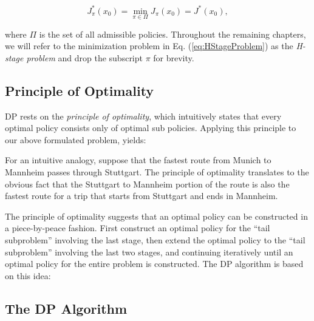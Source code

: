 \begin{equation}
  J_\pi^*(x_0) = \min_{\pi\in\Pi}J_\pi(x_0) = J^*(x_0), \label{eq:HStageProblem}
\end{equation}

where $\Pi$ is the set of all admissible policies. Throughout the remaining
chapters, we will refer to the minimization problem in Eq.
(\ref{eq:HStageProblem}) as the \textit{H-stage problem} and drop the subscript
$\pi$ for brevity.

\subsection*{Principle of Optimality}
DP rests on the \textit{principle of optimality}, which intuitively states that
every optimal policy consists only of optimal sub policies. Applying this
principle to our above formulated problem, yields: 

\begin{center}
\end{center}

For an intuitive analogy, suppose that the fastest route from Munich to Mannheim
passes through Stuttgart. The principle of optimality translates to the obvious
fact that the Stuttgart to Mannheim portion of the route is also the fastest
route for a trip that starts from Stuttgart and ends in Mannheim.

The principle of optimality suggests that an optimal policy can be constructed
in a piece-by-peace fashion. First construct an optimal policy for the ``tail
subproblem'' involving the last stage, then extend the optimal policy to the
``tail subproblem'' involving the last two stages, and continuing iteratively
until an optimal policy for the entire problem is constructed. The DP algorithm
is based on this idea:

\subsection*{The DP Algorithm} \label{sec:DPalgorithm}

